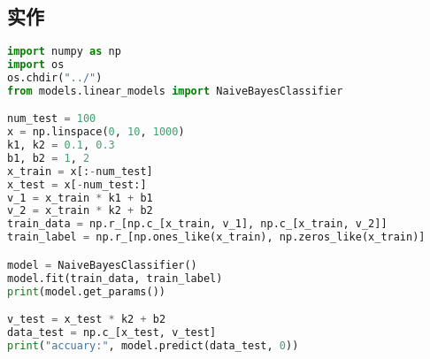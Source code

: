\documentclass{report}
\begin{document}
\subsection{实作}
\begin{lstlisting}[language={python}]
import numpy as np
import os
os.chdir("../")
from models.linear_models import NaiveBayesClassifier

num_test = 100
x = np.linspace(0, 10, 1000)
k1, k2 = 0.1, 0.3
b1, b2 = 1, 2
x_train = x[:-num_test]
x_test = x[-num_test:]
v_1 = x_train * k1 + b1
v_2 = x_train * k2 + b2
train_data = np.r_[np.c_[x_train, v_1], np.c_[x_train, v_2]]
train_label = np.r_[np.ones_like(x_train), np.zeros_like(x_train)]

model = NaiveBayesClassifier()
model.fit(train_data, train_label)
print(model.get_params())

v_test = x_test * k2 + b2
data_test = np.c_[x_test, v_test]
print("accuary:", model.predict(data_test, 0))
\end{lstlisting}
\end{document}
